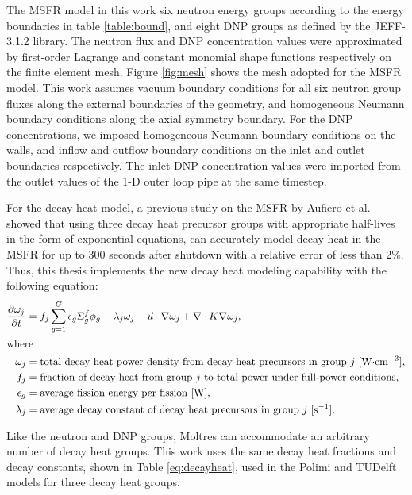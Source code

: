 The \gls{MSFR} model in this work six neutron energy groups according to the
energy boundaries in table \ref{table:bound}, and eight \gls{DNP} groups as
defined by the JEFF-3.1.2 library. The neutron flux
and \gls{DNP} concentration values were approximated by first-order Lagrange
and constant monomial shape functions respectively on the finite element mesh.
Figure \ref{fig:mesh} shows the mesh adopted for the \gls{MSFR} model.
This work assumes vacuum boundary conditions for all six neutron group fluxes
along
the external boundaries of the geometry, and homogeneous Neumann boundary
conditions along the axial symmetry boundary. For the \gls{DNP}
concentrations, we imposed homogeneous Neumann boundary conditions on the
walls, and inflow and outflow boundary conditions on the inlet and outlet
boundaries respectively. The inlet \gls{DNP} concentration values were
imported from the outlet values of the 1-D outer loop pipe at the same
timestep.

For the decay heat model, a previous study on the MSFR by Aufiero et al.
\cite{aufiero_extended_2013} showed that using three decay heat precursor
groups with appropriate half-lives in the form of exponential equations, can
accurately model decay heat in the MSFR for up to 300 seconds after shutdown
with a relative error of less than 2\%. Thus, this thesis implements the new
decay heat modeling capability with the following equation:
%
\begin{align}
	\frac{\partial \omega_j}{\partial t} &= f_j \sum^G_{g=1} \epsilon_{g}
	\Sigma^f_{g} \phi_{g} - \lambda_j \omega_j - \vec{u} \cdot \nabla
	\omega_j + \nabla \cdot K \nabla \omega_j, \label{eq:decayheat} \\
	\intertext{where}
    \omega_j &= \text{total decay heat power density from decay heat
    precursors in group $j$ [W$\cdot$cm$^{-3}$],} \nonumber \\
	f_j &= \text{fraction of decay heat from group $j$ to total power under
	full-power conditions,}
	\nonumber \\
	\epsilon_g &= \text{average fission energy per fission [W],} \nonumber \\
	\lambda_j &= \text{average decay constant of decay heat precursors in
	group $j$ [s$^{-1}$].} \nonumber
\end{align}

Like the neutron and \gls{DNP} groups, Moltres can accommodate an arbitrary
number of decay heat groups. This work uses the same decay heat fractions and decay constants, shown in Table
\ref{eq:decayheat}, used in the Polimi and TUDelft models for three decay heat
groups.

